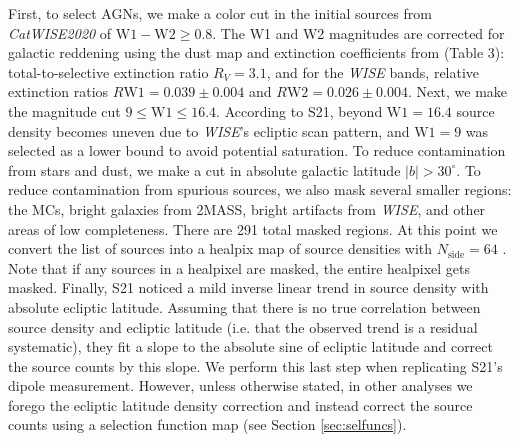 \documentclass[modern]{aastex631}
\newcommand{\catwisetwentytwenty}{\textsl{CatWISE2020}\xspace}
\newcommand{\wise}{\textsl{WISE}\xspace}
\newcommand{\w}{\mathrm{W}}
\begin{document}
First, to select AGNs, we make a color cut in the initial sources from \catwisetwentytwenty of $\w 1-\w 2\geq0.8$.
The W1 and W2 magnitudes are corrected for galactic reddening using the \citet{planck_collaboration_planck_2014} dust map and extinction coefficients from \citet{wang_optical_2019} (Table 3): total-to-selective extinction ratio $R_V=3.1$, and for the \wise bands, relative extinction ratios $R\w 1=0.039\pm 0.004$ and $R\w 2=0.026\pm 0.004$.
Next, we make the magnitude cut $9\leq\w 1\leq 16.4$. According to S21, beyond $\w 1=16.4$ source density becomes uneven due to \wise's ecliptic scan pattern, and $\w 1=9$ was selected as a lower bound to avoid potential saturation.
To reduce contamination from stars and dust, we make a cut in absolute galactic latitude $\vert b\vert > 30^\circ$.
To reduce contamination from spurious sources, we also mask several smaller regions: the MCs, bright galaxies from 2MASS, bright artifacts from \wise, and other areas of low completeness.
There are 291 total masked regions.
At this point we convert the list of sources into a healpix map of source densities with $N_\mathrm{side}=64$ \citep{gorski_healpix_2005}.
Note that if any sources in a healpixel are masked, the entire healpixel gets masked.
Finally, S21 noticed a mild inverse linear trend in source density with absolute ecliptic latitude.
Assuming that there is no true correlation between source density and ecliptic latitude (i.e. that the observed trend is a residual systematic), they fit a slope to the absolute sine of ecliptic latitude and correct the source counts by this slope.
We perform this last step when replicating S21's dipole measurement.
However, unless otherwise stated, in other analyses we forego the ecliptic latitude density correction and instead correct the source counts using a selection function map (see Section \ref{sec:selfuncs}).
\end{document}
